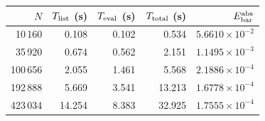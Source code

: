 \begin{tabular}{@{}rrrrr@{}}
\toprule
$N$ & $T_{\rm list}$ (s) & $T_{\rm eval}$ (s) & $T_{\rm total}$ (s) & $E_{\rm bar}^{\rm abs}$\\
\midrule
10\,160  & 0.108 & 0.102 & 0.534 & $5.6610\times10^{-2}$\\
35\,920  & 0.674 & 0.562 & 2.151 & $1.1495\times10^{-3}$\\
100\,656 & 2.055 & 1.461 & 5.568 & $2.1886\times10^{-4}$\\
192\,888 & 5.669 & 3.541 & 13.213 & $1.6778\times10^{-4}$\\
423\,034 & 14.254 & 8.383 & 32.925 & $1.7555\times10^{-4}$\\
\bottomrule
\end{tabular}
